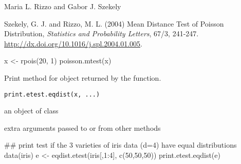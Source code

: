 \documentclass{article}
\begin{document}
\begin{Author}\relax
Maria L. Rizzo  and
Gabor J. Szekely 
\end{Author}
\begin{References}\relax
Szekely, G. J. and Rizzo, M. L. (2004) Mean Distance Test of Poisson Distribution, \emph{Statistics and Probability Letters}, 
67/3, 241-247. \url{http://dx.doi.org/10.1016/j.spl.2004.01.005}.
\end{References}
\begin{SeeAlso}\relax
{}
\end{SeeAlso}
\begin{Examples}
\begin{ExampleCode}
 x <- rpois(20, 1)
 poisson.mtest(x)
 \end{ExampleCode}
\end{Examples}

\begin{Description}\relax
Print method for  object returned by the 
 function.
\end{Description}
\begin{Usage}
\begin{verbatim}
print.etest.eqdist(x, ...)
\end{verbatim}
\end{Usage}
\begin{Arguments}
\begin{ldescription}
\item[\code{x}] an object of class  
\item[\code{...}] extra arguments passed to or from other methods 
\end{ldescription}
\end{Arguments}
\begin{SeeAlso}\relax
{}
\end{SeeAlso}
\begin{Examples}
\begin{ExampleCode}
## print test if the 3 varieties of iris data (d=4) have equal distributions
 data(iris)
 e <- eqdist.etest(iris[,1:4], c(50,50,50))
 print.etest.eqdist(e)
 \end{ExampleCode}
\end{Examples}
\end{document}
